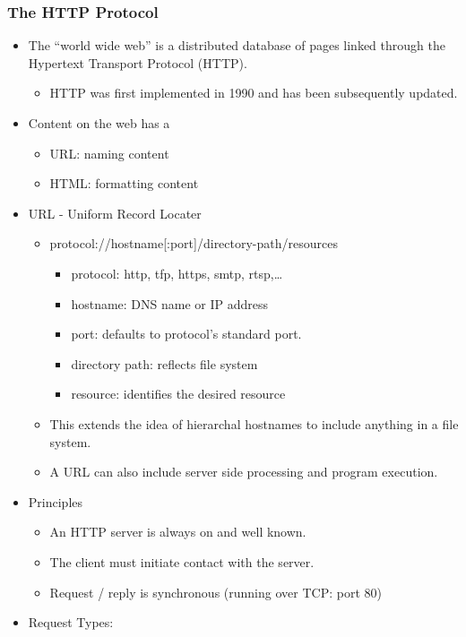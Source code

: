 \hypertarget{the-http-protocol}{%
\subsubsection{The HTTP Protocol}\label{the-http-protocol}}

\begin{itemize}
\item
  The ``world wide web'' is a distributed database of pages linked
  through the Hypertext Transport Protocol (HTTP).

  \begin{itemize}
  \tightlist
  \item
    HTTP was first implemented in 1990 and has been subsequently
    updated.
  \end{itemize}
\item
  Content on the web has a

  \begin{itemize}
  \tightlist
  \item
    URL: naming content
  \item
    HTML: formatting content
  \end{itemize}
\item
  URL - Uniform Record Locater

  \begin{itemize}
  \tightlist
  \item
    protocol://hostname{[}:port{]}/directory-path/resources

    \begin{itemize}
    \tightlist
    \item
      protocol: http, tfp, https, smtp, rtsp,\ldots{}
    \item
      hostname: DNS name or IP address
    \item
      port: defaults to protocol's standard port.
    \item
      directory path: reflects file system
    \item
      resource: identifies the desired resource
    \end{itemize}
  \item
    This extends the idea of hierarchal hostnames to include anything in
    a file system.
  \item
    A URL can also include server side processing and program execution.
  \end{itemize}
\item
  Principles

  \begin{itemize}
  \tightlist
  \item
    An HTTP server is always on and well known.
  \item
    The client must initiate contact with the server.
  \item
    Request / reply is synchronous (running over TCP: port 80)
  \end{itemize}
\item
  Request Types:


\end{itemize}
